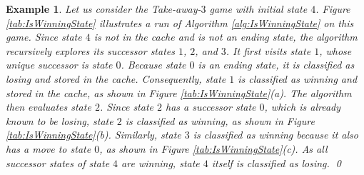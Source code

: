 \documentclass[review]{elsarticle}
\newcommand{\true}{\top}
\newcommand{\false}{\bot}
\newtheorem{example}{Example}
\begin{document}
		\begin{example}\label{exm:IsWinningState} \rm
				Let us consider the Take-away-$3$ game with initial state $4$.
				Figure \ref{tab:IsWinningState} illustrates a run of Algorithm \ref{alg:IsWinningState} on this game.
				Since state $4$ is not in the cache and is not an ending state, the algorithm recursively explores its successor states $1$, $2$, and $3$.
				It first visits state $1$, whose unique successor is state $0$.
				Because state $0$ is an ending state, it is classified as losing and stored in the cache.
				Consequently, state $1$ is classified as winning and stored in the cache, as shown in Figure \ref{tab:IsWinningState}(a).
				The algorithm then evaluates state $2$.
				Since state $2$ has a successor state $0$, which is already known to be losing, state $2$ is classified as winning, as shown in Figure \ref{tab:IsWinningState}(b).
				Similarly, state $3$ is classified as winning because it also has a move to state $0$, as shown in Figure \ref{tab:IsWinningState}(c).
				As all successor states of state $4$ are winning, state $4$ itself is classified as losing. \qed					
%			
    	\end{example}
\end{document}
